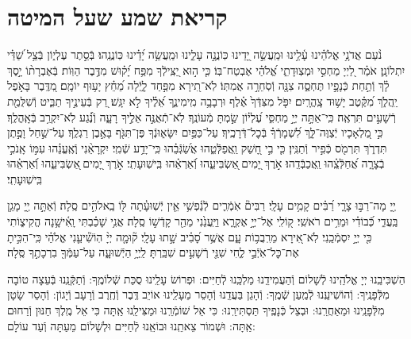 \documentclass[twoside, openany, parskip=half, 11pt]{book}
\begin{document}
\chapter[קריאת שמע שעל המיטה]{ קריאת שמע שעל המיטה }

\shema

\veahavta

נֹ֨עַם אֲדֹנָ֥י אֱלֹהֵ֗ינוּ עָ֫לֵ֥ינוּ וּמַֽעֲשֵׂ֣ה יָ֭דֵינוּ כּֽוֹנֲנָ֣ה עָלֵ֑ינוּ וּמַֽעֲשֵׂ֥ה יָ֝דֵ֗ינוּ כּֽוֹנֲנֵֽהוּ׃
בְּֿסֵ֣תֶר עֶלְי֑וֹן בְּֿצֵ֥ל שַׁ֝דַּ֗י יִתְלוֹנָֽן׃
אֹמַ֗ר לַ֭יְיָ מַחְסִ֣י וּמְצֽוּדָתִ֑י אֱ֝לֹהַ֗י אֶבְטַח־בּֽוֹ׃
כִּ֤י ה֣וּא יַ֭צִּֽילְֿךָ מִפַּ֥ח יָ֝ק֗וּשׁ מִדֶּ֥בֶר הַוּֽוֹת׃
בְּֿאֶבְרָת֨וֹ יָ֣סֶךְ לָ֗ךְ וְֿתַ֣חַת כְּֿנָפָ֣יו תֶּחְסֶ֑ה צִנָּ֖ה וְֿסֹֽחֵרָ֣ה אֲמִתּֽוֹ׃
לֹֽא־תִ֭ירָא מִפַּ֣חַד לָ֑יְֿלָה מֵ֝חֵ֗ץ יָע֥וּף יוֹמָֽם׃
מִ֭דֶּֽבֶר בָּאֹ֣פֶל יַֽהֲלֹ֑ךְ מִ֝קֶּ֗טֶב יָשׁ֥וּד צָֽהֳרָֽיִם׃
יִפֹּ֤ל מִצִּדְּֿךָ֙ אֶ֗לֶף וּרְבָבָ֥ה מִֽימִינֶ֑ךָ אֵ֝לֶ֗יךָ לֹ֣א יִגָּֽשׁ׃
רַ֭ק בְּֿעֵינֶ֣יךָ תַבִּ֑יט וְֿשִׁלֻּמַ֖ת רְֿשָׁעִ֣ים תִּרְאֶֽה׃
כִּֽי־אַתָּ֣ה יְיָ֣ מַחְסִּ֑י עֶ֝לְי֗וֹן שַׂ֣מְתָּ מְֿעוֹנֶֽךָ׃
לֹֽא־תְֿאֻנֶּ֣ה אֵלֶ֣יךָ רָעָ֑ה וְֿנֶ֗֝גַע לֹֽא־יִקְרַ֥ב בְּֿאָֽהֳלֶֽךָ׃
כִּ֣י מַ֭לְאָכָיו יְֿצַוֶּה־לָּ֑ךְ לִ֝שְׁמָרְֿךָ֗ בְּֿכׇל־דְּֿרָכֶֽיךָ׃
עַל־כַּפַּ֥יִם יִשָּׂא֑וּנְֿךָ פֶּן־תִּגֹּ֖ף בָּאֶ֣בֶן רַגְלֶֽךָ׃
עַל־שַׁ֣חַל וָפֶ֣תֶן תִּדְרֹ֑ךְ תִּרְמֹ֖ס כְּֿפִ֣יר וְֿתַנִּֽין׃
כִּ֤י בִ֣י חָ֭שַׁק וַֽאֲפַלְּֿטֵ֑הוּ אֲשַׂ֝גְּֿבֵ֗הוּ כִּֽי־יָדַ֥ע שְֿׁמִֽי׃
יִקְרָאֵ֨נִי וְֽֿאֶֽעֱנֵ֗הוּ עִמּ֣וֹ אָֽנֹכִ֣י בְֿצָרָ֑ה אֲ֝חַלְּֿצֵֽ֗הוּ וַֽאֲכַבְּֿדֵֽהוּ׃
אֹ֣רֶךְ יָ֭מִים ֖אַשְׂבִּיעֵ֑הוּ וְֿ֝אַרְאֵ֗הוּ בִּֽישֽׁוּעָתִֽי׃
אֹ֣רֶךְ יָ֭מִים ֖אַשְׂבִּיעֵ֑הוּ וְֿ֝אַרְאֵ֗הוּ בִּֽישֽׁוּעָתִֽי׃

יְ֖יָ מָה־רַבּ֣וּ צָרָ֑י רַ֝בִּ֗ים קָמִ֥ים עָלָֽי׃ רַבִּים֘ אֹֽמְֿרִ֢ים לְֿנַ֫פְשִׁ֥י אֵ֤ין יְֿשֽׁוּעָ֓תָה לּ֖וֹ בֵֽאלֹהִ֣ים סֶֽלָה׃ וְֿאַתָּ֣ה יְ֖יָ מָגֵ֥ן בַּֽעֲדִ֑י כְּֿ֝בוֹדִ֗י וּמֵרִ֥ים רֹאשִֽׁי׃ ק֭וֹלִֽי אֶל־יְיָ֣ אֶקְרָ֑א וַיַּֽעֲנֵ֙נִי מֵהַ֖ר קָדְֿשׁ֣וֹ סֶֽלָה׃ אֲנִ֥י שָׁכַ֗בְתִּי וָֽאִ֫ישָׁ֥נָה הֱקִיצ֑וֹתִי כִּ֖י יְיָ֣ יִסְמְֿכֵֽנִי׃ לֹֽא־אִ֭ירָא מֵרִֽבֲב֥וֹת עָ֑ם אֲשֶׁ֥ר סָ֝בִ֗יב שָׁ֣תוּ עָלָֽי׃ ק֘וּמָ֤ה יְיָ֨ הֽוֹשִׁ֘יעֵ֤נִי אֱלֹהַ֗י כִּֽי־הִכִּ֣יתָ אֶת־כׇּל־אֹֽיְֿבַ֣י לֶ֑חִי שִׁנֵּ֖י רְֿשָׁעִ֣ים שִׁבַּֽרְתָּ׃ לַֽיְיָ֥ הַיְֿשׁוּעָ֑ה עַל־עַמְּֿךָ֖ בִרְכָתֶ֣ךָ סֶּֽלָה׃

הַשְׁכִּיבֵֽנוּ יְיָ אֱלֹהֵֽינוּ לְֿשָׁלוֹם וְֿהַעֲמִידֵֽנוּ מַלְכֵּֽנוּ לְֿחַיִּים: וּפְרוֹשׂ עָלֵֽינוּ סֻכַּת שְֿׁלוֹמֶֽךָ: וְֿתַקְּֿנֵֽנוּ בְּֿעֵצָה טוֹבָה מִלְּֿפָנֶֽיךָ: וְֿהוֹשִׁיעֵֽנוּ לְֿמַֽעַן שְֿׁמֶֽךָ: וְֿהָגֵן בַּעֲדֵֽנוּ וְֿהָסֵר מֵעָלֵֽינוּ אוֹיֵב דֶּֽבֶר וְֿחֶֽרֶב וְֿרָעָב וְֿיָגוֹן: וְֿהָסֵר שָׂטָן מִלְּֿפָנֵֽינוּ וּמֵאַחֲרֵֽנוּ: וּבְצֵל כְּֿנָפֶֽיךָ תַּסְתִּירֵֽנוּ: כִּי אֵל שׁוֹמְֿרֵֽנוּ וּמַצִּילֵֽנוּ אַֽתָּה כִּי אֵל מֶֽלֶךְ חַנּוּן וְֿרַחוּם אַֽתָּה: וּשְׁמוֹר צֵאתֵֽנוּ וּבוֹאֵֽנוּ לְֿחַיִּים וּלְשָׁלוֹם מֵעַתָּה וְֿעַד עוֹלָם:
\end{document}
